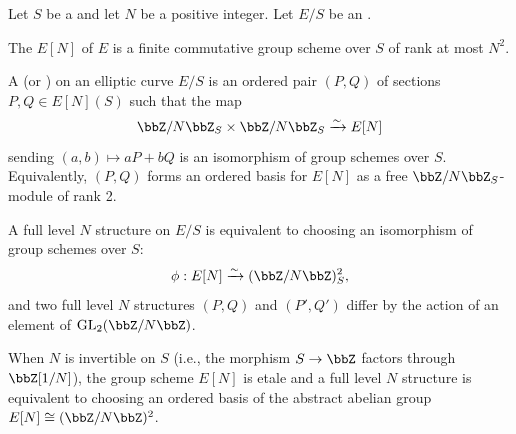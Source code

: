 \begin{definition} \label{definition:full_level_N_structure_on_an_elliptic_curve_over_a_scheme}
    Let $S$ be a  and let $N$ be a positive integer. Let $E/S$ be an . 
    
    The  $E[N]$ of $E$ is a finite commutative group scheme over $S$ of rank at most $N^2$.

    A  (or ) on an elliptic curve $E/S$ is an ordered pair $(P, Q)$ of sections $P, Q \in E[N](S)$ such that the map
    $$\bbZ/N\bbZ_S \times \bbZ/N\bbZ_S \xrightarrow{\sim} E[N]$$
    sending $(a, b) \mapsto aP + bQ$ is an isomorphism of group schemes over $S$. Equivalently, $(P, Q)$ forms an ordered basis for $E[N]$ as a free $\bbZ/N\bbZ_S$-module of rank 2.

    A full level $N$ structure on $E/S$ is equivalent to choosing an isomorphism of group schemes over $S$:
    $$\phi : E[N] \xrightarrow{\sim} (\bbZ/N\bbZ)^2_S,$$
    and two full level $N$ structures $(P, Q)$ and $(P', Q')$ differ by the action of an element of $\operatorname{GL}_2(\bbZ/N\bbZ)$.

    When $N$ is invertible on $S$ (i.e., the morphism $S \to \bbZ$ factors through $\bbZ[1/N]$), the group scheme $E[N]$ is etale and a full level $N$ structure is equivalent to choosing an ordered basis of the abstract abelian group $E[N] \cong (\bbZ/N\bbZ)^2$.
\end{definition}